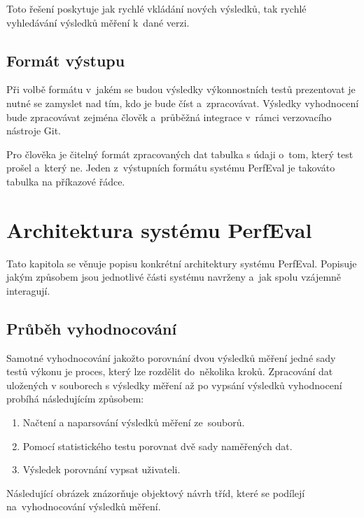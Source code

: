 Toto řešení poskytuje jak rychlé vkládání nových výsledků, tak rychlé vyhledávání výsledků měření k~dané verzi.

\subsection{Formát výstupu}

Při volbě formátu v~jakém se budou výsledky výkonnostních testů prezentovat je nutné se zamyslet nad tím, kdo je bude číst a~zpracovávat.
Výsledky vyhodnocení bude zpracovávat zejména člověk a~průběžná integrace v~rámci verzovacího nástroje Git.

Pro člověka je čitelný formát zpracovaných dat tabulka s údaji o~tom, který test prošel a~který ne.
Jeden z~výstupních formátu systému PerfEval je takováto tabulka na příkazové řádce.

\section{Architektura systému PerfEval}

Tato kapitola se věnuje popisu konkrétní architektury systému PerfEval.
Popisuje jakým způsobem jsou jednotlivé části systému navrženy a~jak spolu vzájemně interagují.

\subsection{Průběh vyhodnocování}

Samotné vyhodnocování jakožto porovnání dvou výsledků měření jedné sady testů výkonu je proces, který lze rozdělit do~několika kroků.
Zpracování dat uložených v souborech s výsledky měření až po vypsání výsledků vyhodnocení probíhá následujícím způsobem:

\begin{enumerate}
    \item Načtení a naparsování výsledků měření ze~souborů.
    \item Pomocí statistického testu porovnat dvě sady naměřených dat.
    \item Výsledek porovnání vypsat uživateli.
\end{enumerate}

Následující obrázek znázorňuje objektový návrh tříd, které se podílejí na~vyhodnocování výsledků měření.

